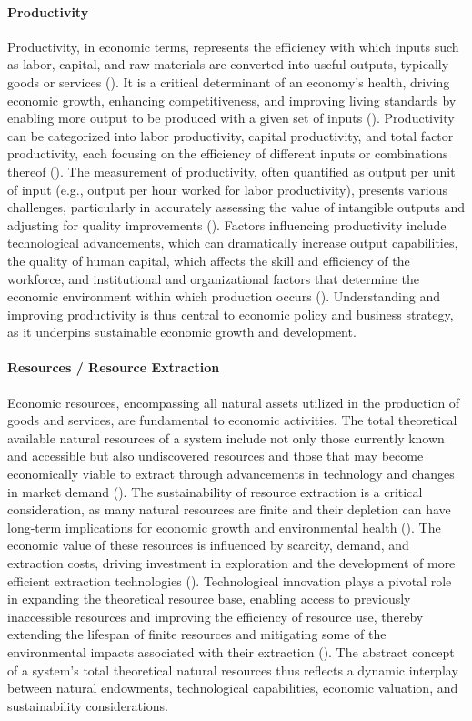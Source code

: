 \documentclass{article}
\begin{document}
\paragraph{Productivity}
Productivity, in economic terms, represents the efficiency with which inputs such as labor, capital, and raw materials are converted into useful outputs, typically goods or services (\cite{textbook}). It is a critical determinant of an economy's health, driving economic growth, enhancing competitiveness, and improving living standards by enabling more output to be produced with a given set of inputs (\cite{oecd}). Productivity can be categorized into labor productivity, capital productivity, and total factor productivity, each focusing on the efficiency of different inputs or combinations thereof (\cite{fried}). The measurement of productivity, often quantified as output per unit of input (e.g., output per hour worked for labor productivity), presents various challenges, particularly in accurately assessing the value of intangible outputs and adjusting for quality improvements (\cite{salter}). Factors influencing productivity include technological advancements, which can dramatically increase output capabilities, the quality of human capital, which affects the skill and efficiency of the workforce, and institutional and organizational factors that determine the economic environment within which production occurs (\cite{technicalChange}). Understanding and improving productivity is thus central to economic policy and business strategy, as it underpins sustainable economic growth and development.

\paragraph{Resources / Resource Extraction}
Economic resources, encompassing all natural assets utilized in the production of goods and services, are fundamental to economic activities. The total theoretical available natural resources of a system include not only those currently known and accessible but also undiscovered resources and those that may become economically viable to extract through advancements in technology and changes in market demand (\cite{environmentalEconomics}). The sustainability of resource extraction is a critical consideration, as many natural resources are finite and their depletion can have long-term implications for economic growth and environmental health (\cite{limitsToGrowth}). The economic value of these resources is influenced by scarcity, demand, and extraction costs, driving investment in exploration and the development of more efficient extraction technologies (\cite{resourceEconomics}). Technological innovation plays a pivotal role in expanding the theoretical resource base, enabling access to previously inaccessible resources and improving the efficiency of resource use, thereby extending the lifespan of finite resources and mitigating some of the environmental impacts associated with their extraction (\cite{technologyResourceExtraction}). The abstract concept of a system's total theoretical natural resources thus reflects a dynamic interplay between natural endowments, technological capabilities, economic valuation, and sustainability considerations.
\end{document}
